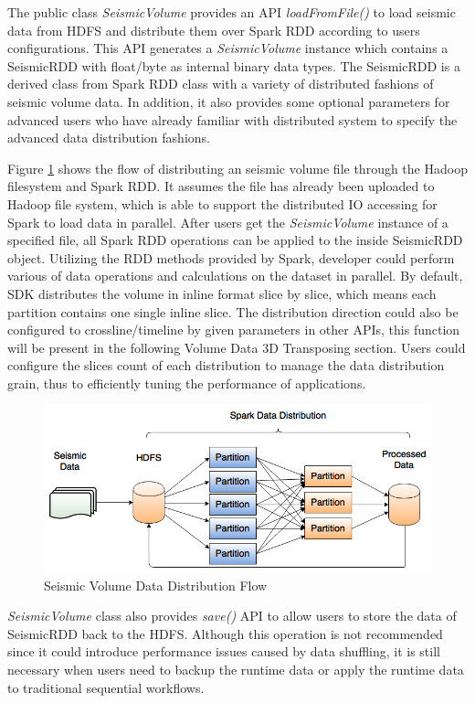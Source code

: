 The public class \emph{SeismicVolume} provides an API \emph{loadFromFile()} to load seismic data from HDFS and distribute them over Spark RDD according to users configurations. This API generates a \emph{SeismicVolume} instance which contains a SeismicRDD with float/byte as internal binary data types. The SeismicRDD is a derived class from Spark RDD class with a variety of distributed fashions of seismic volume data. In addition, it also provides some optional parameters for advanced users who have already familiar with distributed system to specify the advanced data distribution fashions. 

Figure \ref{datadist} shows the flow of distributing an seismic volume file through the Hadoop filesystem and Spark RDD. It assumes the file has already been uploaded to Hadoop file system, which is able to support the distributed IO accessing for Spark to load data in parallel. After users get the  \emph{SeismicVolume} instance of a specified file,  all Spark RDD operations can be applied to the inside SeismicRDD object. Utilizing the RDD methods provided by Spark, developer could perform various of data operations and calculations on the dataset in parallel. By default, SDK distributes the volume in inline format slice by slice, which means each partition contains one single inline slice. The distribution direction could also be configured to crossline/timeline by given parameters in other APIs, this function will be present in the following Volume Data 3D Transposing section. Users could configure the slices count of each distribution to manage the data distribution grain, thus to efficiently tuning the performance of applications.

\begin{figure}[h]
\centering
\includegraphics[scale=0.6]{figures/datadist.png}
\caption{Seismic Volume Data Distribution Flow}
\label{datadist}
\end{figure}

\emph{SeismicVolume} class also provides \emph{save()} API to allow users to store the data of SeismicRDD back to the HDFS. Although this operation is not recommended since it could introduce performance issues caused by data shuffling, it is still necessary when users need to backup the runtime data or apply the runtime data to traditional sequential workflows.


